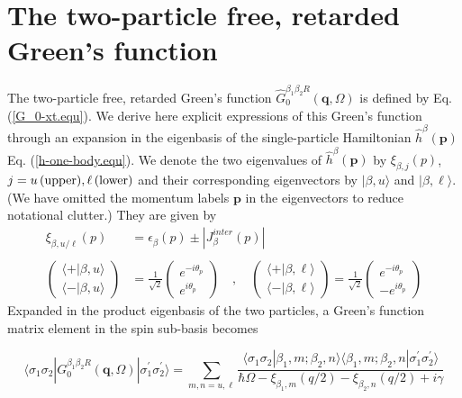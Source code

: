 \documentclass[aps,prb,superscriptaddress,letterpaper,amsmath,amssymb,twocolumn,preprintnumbers]{revtex4}
\begin{document}
\section{The two-particle free, retarded Green's function}\label{G_0.sec}

The two-particle free, retarded Green's function $\hat{G}_{0}^{\beta_1 \beta_2 R} (\mathbf{q},\Omega)$ is defined by Eq. (\ref{G_0-xt.equ}). We derive here explicit expressions of this Green's function through an expansion in the eigenbasis of the single-particle Hamiltonian $\hat{h}^{\beta} (\mathbf{p})$ Eq. (\ref{h-one-body.equ}). We denote the two eigenvalues of $\hat{h}^{\beta} (\mathbf{p})$ by $\xi^{}_{\beta , j} (p)$, $j = u \, {\rm (upper)} , \ell \, {\rm (lower)}$ and their corresponding eigenvectors by $| \beta , u \rangle$ and $| \beta , \ell \rangle$. (We have omitted the momentum labels $\mathbf{p}$ in the eigenvectors to reduce notational clutter.) They are given by
\begin{align}
\xi^{}_{\beta , u / \ell} (p) &= \epsilon^{}_{\beta} (p) \pm | J^{inter}_{\beta} (p) | \\
\nonumber \\
\label{eigenvectors.equ}
\begin{pmatrix}
\langle + | \beta , u \rangle \\ \langle - | \beta , u \rangle
\end{pmatrix}
&= \frac {1} {\sqrt{2}}
\begin{pmatrix}
e^{- i \theta_p} \\ e^{i \theta_p}
\end{pmatrix}
\quad , \quad
\begin{pmatrix}
\langle + | \beta , \ell \rangle \\ \langle - | \beta , \ell \rangle
\end{pmatrix}
= \frac {1} {\sqrt{2}}
\begin{pmatrix}
e^{- i \theta_p} \\ - e^{i \theta_p}
\end{pmatrix}
\end{align}
Expanded in the product eigenbasis of the two particles, a Green's function matrix element in the spin sub-basis becomes
\begin{widetext}
\begin{equation}\label{G_0-xt-e1.equ}
\langle \sigma_1 \sigma_2 | {G}_{0}^{\beta_1 \beta_2 R} (\mathbf{q},\Omega) | \sigma^{\prime}_1 \sigma^{\prime}_2 \rangle = \sum_{m,n = u,\ell} \frac { \langle \sigma_1 \sigma_2 | \beta_1 , m ; \beta_2 , n \rangle  \langle \beta_1 , m ; \beta_2 , n | \sigma^{\prime}_1 \sigma^{\prime}_2 \rangle } {\hbar \Omega - \xi^{}_{\beta_1 , m} ({q} / 2) - \xi^{}_{\beta_2 , n} ({q} / 2) + i \gamma}
\end{equation}
\end{widetext}
\end{document}
